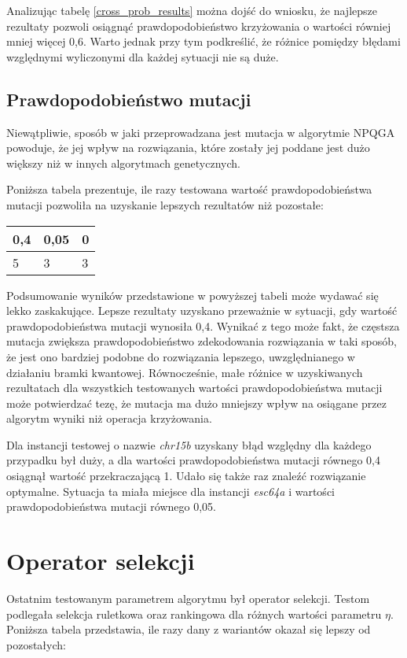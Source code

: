 Analizując tabelę \ref{cross_prob_results} można dojść do wniosku, że najlepsze rezultaty pozwoli osiągnąć prawdopodobieństwo krzyżowania o wartości równiej mniej więcej 0,6. Warto jednak przy tym podkreślić, że różnice pomiędzy błędami względnymi wyliczonymi dla każdej sytuacji nie są duże.

\subsection{Prawdopodobieństwo mutacji}
Niewątpliwie, sposób w jaki przeprowadzana jest mutacja w algorytmie NPQGA powoduje, że jej wpływ na rozwiązania, które zostały jej poddane jest dużo większy niż w innych algorytmach genetycznych.

Poniższa tabela prezentuje, ile razy testowana wartość prawdopodobieństwa mutacji pozwoliła na uzyskanie lepszych rezultatów niż pozostałe:

\begin{table}[H]
\label{bramka_results}
\begin{tabular}{l l l}
\hline
0,4 & 0,05 & 0 \\
\hline
5 & 3 & 3 \\
\hline
\end{tabular}
\end{table}

Podsumowanie wyników przedstawione w powyższej tabeli może wydawać się lekko zaskakujące. Lepsze rezultaty uzyskano przeważnie w sytuacji, gdy wartość prawdopodobieństwa mutacji wynosiła 0,4. Wynikać z tego może fakt, że częstsza mutacja zwiększa prawdopodobieństwo zdekodowania rozwiązania w taki sposób, że jest ono bardziej podobne do rozwiązania lepszego, uwzględnianego w działaniu bramki kwantowej. Równocześnie, małe różnice w uzyskiwanych rezultatach dla wszystkich testowanych wartości prawdopodobieństwa mutacji może potwierdzać tezę, że mutacja ma dużo mniejszy wpływ na osiągane przez algorytm wyniki niż operacja krzyżowania.

Dla instancji testowej o nazwie \textit{chr15b} uzyskany błąd względny dla każdego przypadku był duży, a dla wartości prawdopodobieństwa mutacji równego 0,4 osiągnął wartość przekraczającą 1. Udało się także raz znaleźć rozwiązanie optymalne. Sytuacja ta miała miejsce dla instancji \textit{esc64a} i wartości prawdopodobieństwa mutacji równego 0,05.

\section{Operator selekcji}
Ostatnim testowanym parametrem algorytmu był operator selekcji. Testom podlegała selekcja ruletkowa oraz rankingowa dla różnych wartości parametru $\eta$. Poniższa tabela przedstawia, ile razy dany z wariantów okazał się lepszy od pozostałych:

